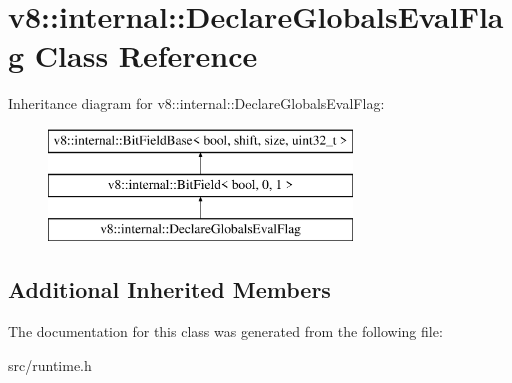 \hypertarget{classv8_1_1internal_1_1_declare_globals_eval_flag}{}\section{v8\+:\+:internal\+:\+:Declare\+Globals\+Eval\+Flag Class Reference}
\label{classv8_1_1internal_1_1_declare_globals_eval_flag}
Inheritance diagram for v8\+:\+:internal\+:\+:Declare\+Globals\+Eval\+Flag\+:\begin{figure}[H]
\begin{center}
\leavevmode
\includegraphics[height=3.000000cm]{classv8_1_1internal_1_1_declare_globals_eval_flag}
\end{center}
\end{figure}
\subsection*{Additional Inherited Members}


The documentation for this class was generated from the following file\+:\begin{DoxyCompactItemize}
\item 
src/runtime.\+h\end{DoxyCompactItemize}
